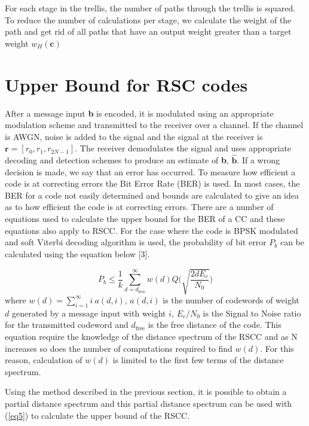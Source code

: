 \documentclass[fontsize=12pt]{article}
\begin{document}
  For each stage in the trellis, the number of paths through the trellis is squared. To reduce the number of calculations per stage, we calculate the weight of the path and get rid of all paths that have an output weight greater than a target weight $w_H(\textbf{c})$

\section{Upper Bound for RSC codes}
\label{sec4}
After a message input \textbf{b} is encoded, it is modulated using an appropriate modulation scheme and transmitted to the receiver over a channel. If the channel is AWGN, noise is added to the signal and the signal at the receiver is $\textbf{r}=[r_0,r_1,r_{2N-1}]$. The receiver demodulates the signal and uses appropriate decoding and detection schemes to produce an estimate of \textbf{b}, $\hat{ \textbf{b} }$. If a wrong decision is made, we say that an error has occurred. To measure how efficient a code is at correcting errors the Bit Error Rate (BER) is used. In most cases, the BER for a code not easily determined and bounds are calculated to give an idea as to how efficient the code is at correcting errors. There are a number of equations used to calculate the upper bound for the BER of a CC and these equations also apply to RSCC. For the case where the code is BPSK modulated and soft Viterbi decoding algorithm is used, the probability of bit error $P_b$ can be calculated using the equation below [3].

\begin{equation}
P_b \leq \frac{1}{k} \sum_{d=d_{\text{free}}}^{\infty} w(d) Q\Bigg( \sqrt{\frac{2dE_c}{N_0}}\Bigg)
\label{eq5}
\end{equation}
where $w(d)=\sum_{i=1}^{\infty} i~ a(d,i)$, $a(d,i)$ is the number of codewords of weight $d$ generated by a message input with weight $i$,  $E_c/N_0$ is the Signal to Noise ratio for the transmitted codeword and $d_{\text{free}}$ is the free distance of the code. This equation require the knowledge of the distance spectrum of the RSCC and as N increases so does the number of computations required to find $w(d)$. For this reason, calculation of $w(d)$ is limited to the first few terms of the distance spectrum. 

Using the method described in the previous section, it is possible to obtain a partial distance spectrum and this partial distance spectrum can be used with (\ref{eq5}) to calculate the upper bound of the RSCC. 
\end{document}
